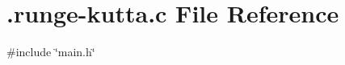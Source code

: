 \hypertarget{_8runge-kutta_8c}{}\section{.runge-\/kutta.c File Reference}
\label{_8runge-kutta_8c}
{\ttfamily \#include \char`\"{}main.\+h\char`\"{}}\newline
